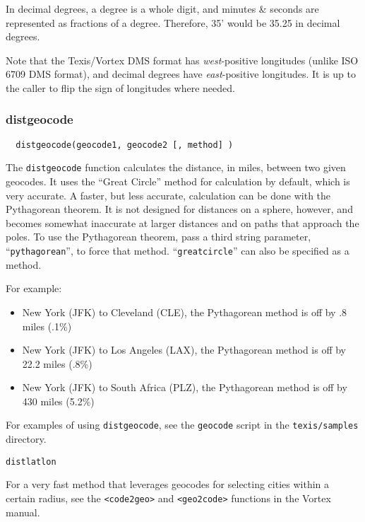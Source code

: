 In decimal degrees, a degree is a whole digit, and minutes \& seconds
are represented as fractions of a degree.  Therefore, 35'
would be 35.25 in decimal degrees.

Note that the Texis/Vortex DMS format has {\em west}-positive
longitudes (unlike ISO 6709 DMS format), and decimal
degrees have {\em east}-positive longitudes.  It is up to the caller
to flip the sign of longitudes where needed.

\subsubsection{distgeocode}

\begin{verbatim}
  distgeocode(geocode1, geocode2 [, method] )
\end{verbatim}

The \verb`distgeocode` function calculates the distance, in miles,
between two given geocodes.  It uses the ``Great Circle'' method for
calculation by default, which is very accurate.  A faster, but less
accurate, calculation can be done with the Pythagorean theorem.  It is
not designed for distances on a sphere, however, and becomes somewhat  
inaccurate at larger distances and on paths that approach the poles.
To use the Pythagorean theorem, pass a third string parameter,
``\verb`pythagorean`'', to force that method.  ``\verb`greatcircle`''
can also be specified as a method. 

For example:
\begin{itemize}
\item New York (JFK) to Cleveland (CLE), the Pythagorean method is off by 
.8 miles (.1\%)
\item New York (JFK) to Los Angeles (LAX), the Pythagorean method is off by 
22.2 miles (.8\%)
\item New York (JFK) to South Africa (PLZ), the Pythagorean method is off by
430 miles (5.2\%)
\end{itemize}

\EXAMPLE 

For examples of using \verb`distgeocode`, see the \verb`geocode`
script in the \verb`texis/samples` directory.

\SEE

\verb`distlatlon`

For a very fast method that leverages geocodes for selecting cities
within a certain radius, see the \verb`<code2geo>` and \verb`<geo2code>`
functions in the Vortex manual.

